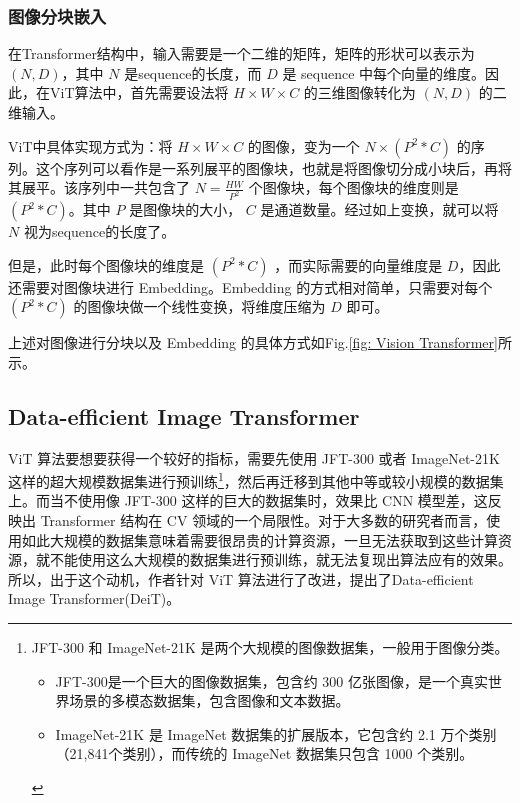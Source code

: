\documentclass[letterpaper,10pt]{article}
\begin{document}
	\subsubsection{图像分块嵌入}
	
	在Transformer结构中，输入需要是一个二维的矩阵，矩阵的形状可以表示为$(N,D)$，其中 $N$ 是sequence的长度，而 $D$ 是 sequence 中每个向量的维度。因此，在ViT算法中，首先需要设法将 $H \times W \times C$ 的三维图像转化为 $\left( N,D \right)$ 的二维输入。
	
	ViT中具体实现方式为：将 $H \times W \times C$ 的图像，变为一个 $N \times \left( P^2 * C \right)$ 的序列。这个序列可以看作是一系列展平的图像块，也就是将图像切分成小块后，再将其展平。该序列中一共包含了 $N = \frac{HW}{P^2}$ 个图像块，每个图像块的维度则是 $\left(P^2 * C\right)$。其中 $P$ 是图像块的大小， $C$ 是通道数量。经过如上变换，就可以将 $N$ 视为sequence的长度了。

	但是，此时每个图像块的维度是 $\left(P^2 * C\right)$ ，而实际需要的向量维度是 $D$，因此还需要对图像块进行 Embedding。Embedding 的方式相对简单，只需要对每个 $\left(P^2 * C\right)$ 的图像块做一个线性变换，将维度压缩为 $D$ 即可。
	
	上述对图像进行分块以及 Embedding 的具体方式如Fig.\ref{fig: Vision Transformer}所示。
	
	\subsection{Data-efficient Image Transformer\cite{touvron2021training}}
	
	ViT 算法要想要获得一个较好的指标，需要先使用 JFT-300 或者 ImageNet-21K 这样的超大规模数据集进行预训练\footnote{JFT-300 和 ImageNet-21K 是两个大规模的图像数据集，一般用于图像分类。
	\begin{itemize}
		\item {}
		JFT-300是一个巨大的图像数据集，包含约 300 亿张图像，是一个真实世界场景的多模态数据集，包含图像和文本数据。
		\item {}
		ImageNet-21K 是 ImageNet 数据集的扩展版本，它包含约 2.1 万个类别（21,841个类别），而传统的 ImageNet 数据集只包含 1000 个类别。
	\end{itemize}
	}，然后再迁移到其他中等或较小规模的数据集上。而当不使用像 JFT-300 这样的巨大的数据集时，效果比 CNN 模型差，这反映出 Transformer 结构在 CV 领域的一个局限性。对于大多数的研究者而言，使用如此大规模的数据集意味着需要很昂贵的计算资源，一旦无法获取到这些计算资源，就不能使用这么大规模的数据集进行预训练，就无法复现出算法应有的效果。所以，出于这个动机，作者针对 ViT 算法进行了改进，提出了Data-efficient Image Transformer(DeiT)。
	
\end{document}
